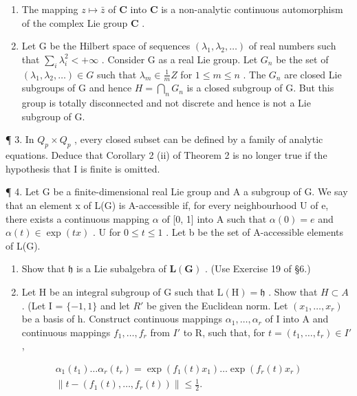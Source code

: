
\begin{enumerate}
\def\labelenumi{\arabic{enumi}.}
\item
  The mapping \(z \mapsto \bar{z}\) of \(\mathbf{C}\) into \(\mathbf{C}\) is a non-analytic continuous automorphism of the complex Lie group \(\mathbf{C}\) .
\item
  Let G be the Hilbert space of sequences \((\lambda_{1}, \lambda_{2}, \ldots)\) of real numbers such that \(\sum_{i} \lambda_{i}^{2} < +\infty\) . Consider G as a real Lie group. Let \(G_{n}\) be the set of \((\lambda_{1}, \lambda_{2}, \ldots) \in G\) such that \(\lambda_{m} \in \frac{1}{m} Z\) for \(1 \leqslant m \leqslant n\) . The \(G_{n}\) are closed Lie subgroups of G and hence \(H = \bigcap_{n} G_{n}\) is a closed subgroup of G. But this group is totally disconnected and not discrete and hence is not a Lie subgroup of G.
\end{enumerate}

¶ 3. In \(Q_{p} \times Q_{p}\) , every closed subset can be defined by a family of analytic equations. Deduce that Corollary 2 (ii) of Theorem 2 is no longer true if the hypothesis that I is finite is omitted.

¶ 4. Let G be a finite-dimensional real Lie group and A a subgroup of G. We say that an element x of L(G) is A-accessible if, for every neighbourhood U of e, there exists a continuous mapping \(\alpha\) of {[}0, 1{]} into A such that \(\alpha(0) = e\) and \(\alpha(t) \in \exp(tx)\) . U for \(0 \leqslant t \leqslant 1\) . Let b be the set of A-accessible elements of L(G).

\begin{enumerate}
\def\labelenumi{(\alph{enumi})}
\item
  Show that \(\mathfrak{h}\) is a Lie subalgebra of \(\mathbf{L}(\mathbf{G})\) . (Use Exercise 19 of §6.)
\item
  Let H be an integral subgroup of G such that \(\mathrm{L}(\mathrm{H}) = \mathfrak{h}\) . Show that \(H \subset A\) . (Let I = \(\{-1, 1\}\) and let \(R'\) be given the Euclidean norm. Let \((x_{1}, \ldots, x_{r})\) be a basis of h. Construct continuous mappings \(\alpha_{1}, \ldots, \alpha_{r}\) of I into A and continuous mappings \(f_{1}, \ldots, f_{r}\) from \(I'\) to R, such that, for \(t = (t_{1}, \ldots, t_{r}) \in I'\) ,
\end{enumerate}

\[
\begin{array}{c} \alpha_ {1} (t _ {1}) \ldots \alpha_ {r} (t _ {r}) = \exp (f _ {1} (t) x _ {1}) \ldots \exp (f _ {r} (t) x _ {r}) \\ \| t - (f _ {1} (t), \ldots , f _ {r} (t)) \| \leqslant \frac {1}{2}. \end{array}
\]

